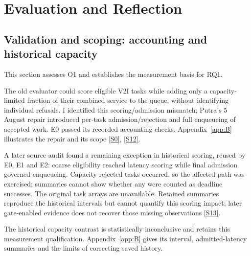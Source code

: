 \documentclass[12pt,a4paper]{article}
\begin{document}
\FloatBarrier
\section{Evaluation and Reflection}\label{sec:3}

\FloatBarrier
\subsection{Validation and scoping: accounting and historical capacity}\label{sec:3.1}

This section assesses O1 and establishes the measurement basis for RQ1.

The old evaluator could score eligible V2I tasks while adding only a capacity-limited fraction of their combined service to the queue, without identifying individual refusals. I identified this scoring/admission mismatch; Putra's 5 August repair introduced per-task admission/rejection and full enqueueing of accepted work. E0 passed its recorded accounting checks. Appendix~\ref{app:B} illustrates the repair and its scope \hyperref[source-s0]{[S0]}, \hyperref[source-s12]{[S12]}.



A later source audit found a remaining exception in historical  scoring, reused by E0, E1 and E2: coarse eligibility reached latency scoring while final admission governed enqueueing. Capacity-rejected tasks occurred, so the affected path was exercised; summaries cannot show whether any were counted as deadline successes. The original task arrays are unavailable. Retained summaries reproduce the historical intervals but cannot quantify this scoring impact; later gate-enabled evidence does not recover those missing observations \hyperref[source-s13]{[S13]}.

The historical capacity contrast is statistically inconclusive and retains this measurement qualification. Appendix~\ref{app:B} gives its interval, admitted-latency summaries and the limits of correcting saved history.

\end{document}
